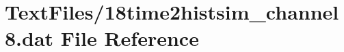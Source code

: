 \hypertarget{18time2histsim__channel8_8dat}{}\section{Text\+Files/18time2histsim\+\_\+channel8.dat File Reference}
\label{18time2histsim__channel8_8dat}
